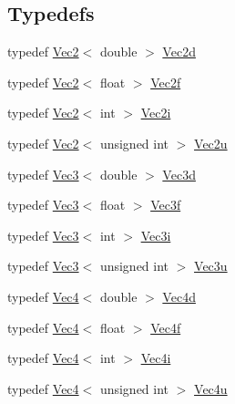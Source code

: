 \subsection*{Typedefs}
\begin{DoxyCompactItemize}
\item 
typedef \hyperlink{structpcs_1_1Vec2}{Vec2}$<$ double $>$ \hyperlink{namespacepcs_acc216b704c01ee5f725075dabe53e085}{Vec2d}
\item 
typedef \hyperlink{structpcs_1_1Vec2}{Vec2}$<$ float $>$ \hyperlink{namespacepcs_a4b2fd718bd0800b6aa492b1c60f19edc}{Vec2f}
\item 
typedef \hyperlink{structpcs_1_1Vec2}{Vec2}$<$ int $>$ \hyperlink{namespacepcs_af322f6d2ecaff325ab1ab8d243e1bc02}{Vec2i}
\item 
typedef \hyperlink{structpcs_1_1Vec2}{Vec2}$<$ unsigned int $>$ \hyperlink{namespacepcs_a3765be05787916d050ad7203dd4a9064}{Vec2u}
\item 
typedef \hyperlink{structpcs_1_1Vec3}{Vec3}$<$ double $>$ \hyperlink{namespacepcs_ad162884a2f34ac8048b26b5393a41981}{Vec3d}
\item 
typedef \hyperlink{structpcs_1_1Vec3}{Vec3}$<$ float $>$ \hyperlink{namespacepcs_a68e0f517680976c17c810ffe6952cbab}{Vec3f}
\item 
typedef \hyperlink{structpcs_1_1Vec3}{Vec3}$<$ int $>$ \hyperlink{namespacepcs_a90c0b9d4184dcb79e95ac2ce79287614}{Vec3i}
\item 
typedef \hyperlink{structpcs_1_1Vec3}{Vec3}$<$ unsigned int $>$ \hyperlink{namespacepcs_a2fb79528e302be33c240f71df13454ac}{Vec3u}
\item 
typedef \hyperlink{structpcs_1_1Vec4}{Vec4}$<$ double $>$ \hyperlink{namespacepcs_a16e5649fe0d83b923040c93b9895f9c9}{Vec4d}
\item 
typedef \hyperlink{structpcs_1_1Vec4}{Vec4}$<$ float $>$ \hyperlink{namespacepcs_a826b4146f438aa3a4c6a5c157bc8dea2}{Vec4f}
\item 
typedef \hyperlink{structpcs_1_1Vec4}{Vec4}$<$ int $>$ \hyperlink{namespacepcs_acc781a5c34ea403d128e3e500c74d9ad}{Vec4i}
\item 
typedef \hyperlink{structpcs_1_1Vec4}{Vec4}$<$ unsigned int $>$ \hyperlink{namespacepcs_a4adb2d4806269c0560cf9dee9a4bbf86}{Vec4u}
\end{DoxyCompactItemize}
